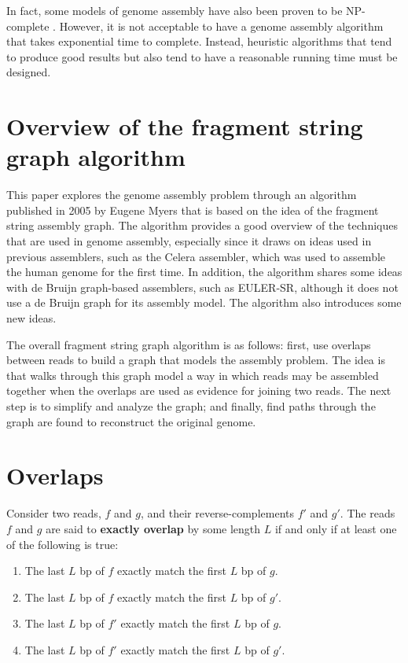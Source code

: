 \documentclass[10pt]{article}
\newcommand{\LengthVar}{L}
\begin{document}
In fact, some models of genome assembly have also been proven to be NP-complete
\cite{Medvedev2007}.  However, it is not acceptable to have a genome assembly
algorithm that takes exponential time to complete.  Instead, heuristic
algorithms that tend to produce good results but also tend to have a reasonable
running time must be designed.

\section{Overview of the fragment string graph algorithm}

This paper explores the genome assembly problem through an algorithm published
in 2005 by Eugene Myers\cite{Myers2005} that is based on the idea of the
fragment string assembly graph.  The algorithm provides a good overview of the
techniques that are used in genome assembly, especially since it draws on ideas
used in previous assemblers, such as the Celera assembler, which was used to
assemble the human genome for the first time\cite{Venter2001}.  In addition, the
algorithm shares some ideas with de Bruijn graph-based assemblers, such as
EULER-SR\cite{Pevzner2001}, although it does not use a de Bruijn graph for its
assembly model.  The algorithm also introduces some new ideas.

The overall fragment string graph algorithm is as follows: first, use overlaps
between reads to build a graph that models the assembly problem.  The idea is
that walks through this graph model a way in which reads may be assembled
together when the overlaps are used as evidence for joining two reads.  The next
step is to simplify and analyze the graph; and finally, find paths through the
graph are found to reconstruct the original genome.

\section{Overlaps}

	Consider two reads, $f$ and $g$, and their reverse-complements $f'$ and
	$g'$.  The reads $f$ and $g$ are said to {\bf exactly overlap} by some
	length $\LengthVar$ if and only if at least one of the following is
	true:
	\begin{enumerate}
		\item The last $\LengthVar$ bp of $f$ exactly match the first
		$\LengthVar$ bp of $g$.
		\item The last $\LengthVar$ bp of $f$ exactly match the first
		$\LengthVar$ bp of $g'$.
		\item The last $\LengthVar$ bp of $f'$ exactly match the first
		$\LengthVar$ bp of $g$.
		\item The last $\LengthVar$ bp of $f'$ exactly match the first
		$\LengthVar$ bp of $g'$.
	\end{enumerate}
\end{document}
